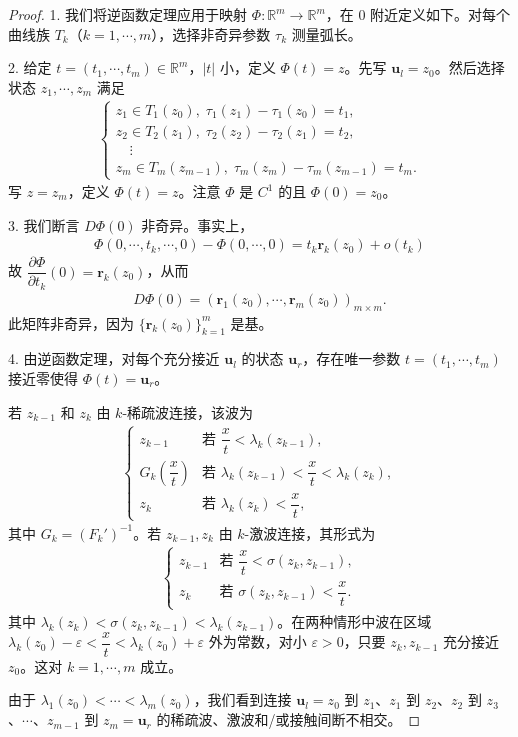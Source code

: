\documentclass[../../main.tex]{subfiles}
\begin{document}
\begin{proof}
1. 我们将逆函数定理应用于映射 $\Phi:\mathbb{R}^m\to\mathbb{R}^m$，在 0 附近定义如下。对每个曲线族 $T_k$（$k=1,\cdots,m$），选择非奇异参数 $\tau_k$ 测量弧长。

2. 给定 $t=(t_1,\cdots,t_m)\in\mathbb{R}^m$，$|t|$ 小，定义 $\Phi(t)=z$。先写 $\mathbf{u}_l=z_0$。然后选择状态 $z_1,\cdots,z_m$ 满足
\begin{align*}
\begin{cases}
z_1\in T_1(z_0),\;\tau_1(z_1)-\tau_1(z_0)=t_1,\\
z_2\in T_2(z_1),\;\tau_2(z_2)-\tau_2(z_1)=t_2,\\
\quad\vdots\\
z_m\in T_m(z_{m-1}),\;\tau_m(z_m)-\tau_m(z_{m-1})=t_m.
\end{cases}
\end{align*}
写 $z=z_m$，定义 $\Phi(t)=z$。注意 $\Phi$ 是 $C^1$ 的且 $\Phi(0)=z_0$。

3. 我们断言 $D\Phi(0)$ 非奇异。事实上，
\begin{align*}
\Phi(0,\cdots,t_k,\cdots,0)-\Phi(0,\cdots,0)=t_k\mathbf{r}_k(z_0)+o(t_k)
\end{align*}
故 $\dfrac{\partial\Phi}{\partial t_k}(0)=\mathbf{r}_k(z_0)$，从而
\begin{align*}
D\Phi(0)=(\mathbf{r}_1(z_0),\cdots,\mathbf{r}_m(z_0))_{m\times m}.
\end{align*}
此矩阵非奇异，因为 $\{\mathbf{r}_k(z_0)\}_{k=1}^m$ 是基。

4. 由逆函数定理，对每个充分接近 $\mathbf{u}_l$ 的状态 $\mathbf{u}_r$，存在唯一参数 $t=(t_1,\cdots,t_m)$ 接近零使得 $\Phi(t)=\mathbf{u}_r$。

若 $z_{k-1}$ 和 $z_k$ 由 $k$-稀疏波连接，该波为
\begin{align*}
\begin{cases}
z_{k-1} & \text{若 } \dfrac{x}{t}<\lambda_k(z_{k-1}),\\
G_k\left(\dfrac{x}{t}\right) & \text{若 } \lambda_k(z_{k-1})<\dfrac{x}{t}<\lambda_k(z_k),\\
z_k & \text{若 } \lambda_k(z_k)<\dfrac{x}{t},
\end{cases}
\end{align*}
其中 $G_k=(F_k')^{-1}$。若 $z_{k-1},z_k$ 由 $k$-激波连接，其形式为
\begin{align*}
\begin{cases}
z_{k-1} & \text{若 } \dfrac{x}{t}<\sigma(z_k,z_{k-1}),\\
z_k & \text{若 } \sigma(z_k,z_{k-1})<\dfrac{x}{t}.
\end{cases}
\end{align*}
其中 $\lambda_k(z_k)<\sigma(z_k,z_{k-1})<\lambda_k(z_{k-1})$。在两种情形中波在区域 $\lambda_k(z_0)-\varepsilon<\dfrac{x}{t}<\lambda_k(z_0)+\varepsilon$ 外为常数，对小 $\varepsilon>0$，只要 $z_k,z_{k-1}$ 充分接近 $z_0$。这对 $k=1,\cdots,m$ 成立。

由于 $\lambda_1(z_0)<\cdots<\lambda_m(z_0)$，我们看到连接 $\mathbf{u}_l=z_0$ 到 $z_1$、$z_1$ 到 $z_2$、$z_2$ 到 $z_3$、$\cdots$、$z_{m-1}$ 到 $z_m=\mathbf{u}_r$ 的稀疏波、激波和/或接触间断不相交。
\end{proof}
\end{document}
